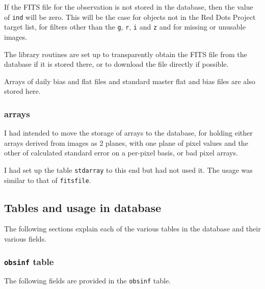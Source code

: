 If the FITS file for the observation is not stored in the database, then the
value of \texttt{ind} will be zero. This will be the case for objects not in the
Red Dots Project target list, for filters other than the \texttt{g}, \texttt{r},
\texttt{i} and \texttt{z} and for missing or unusable images.

The library routines are set up to transparently obtain the FITS file from the
database if it is stored there, or to download the file directly if possible.

Arrays of daily bias and flat files and standard master flat and bias files are
also stored here.

\subsubsection{{\numpy} arrays}
\protect\label{section:numpyarrays}

I had intended to move the storage of {\numpy} arrays to the database, for
holding either arrays derived from images as 2 planes, with one plane of pixel
values and the other of calculated standard error on a per-pixel basis, or bad
pixel arrays.

I had set up the table \texttt{stdarray} to this end but had not used it. The
usage was similar to that of \texttt{fitsfile}.

\subsection{Tables and usage in database}
\protect\label{section:databasetabs}

The following sections explain each of the various tables in the database and
their various fields.

\subsubsection{\texttt{obsinf} table}
\protect\label{section:obsinf}

The following fields are provided in the \texttt{obsinf} table.

